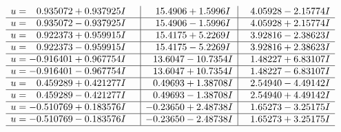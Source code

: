 \documentclass[1p]{elsarticle_modified}
\theoremstyle{definition}
\begin{document}
$$\begin{array}{c|c|c}
\begin{aligned}
u &= \phantom{-}0.935072 + 0.937925 I\end{aligned}
 & \phantom{-}15.4906 + 1.5996 I & \phantom{-}4.05928 - 2.15774 I \\ \hline\begin{aligned}
u &= \phantom{-}0.935072 - 0.937925 I\end{aligned}
 & \phantom{-}15.4906 - 1.5996 I & \phantom{-}4.05928 + 2.15774 I \\ \hline\begin{aligned}
u &= \phantom{-}0.922373 + 0.959915 I\end{aligned}
 & \phantom{-}15.4175 + 5.2269 I & \phantom{-}3.92816 - 2.38623 I \\ \hline\begin{aligned}
u &= \phantom{-}0.922373 - 0.959915 I\end{aligned}
 & \phantom{-}15.4175 - 5.2269 I & \phantom{-}3.92816 + 2.38623 I \\ \hline\begin{aligned}
u &= -0.916401 + 0.967754 I\end{aligned}
 & \phantom{-}13.6047 - 10.7354 I & \phantom{-}1.48227 + 6.83107 I \\ \hline\begin{aligned}
u &= -0.916401 - 0.967754 I\end{aligned}
 & \phantom{-}13.6047 + 10.7354 I & \phantom{-}1.48227 - 6.83107 I \\ \hline\begin{aligned}
u &= \phantom{-}0.459289 + 0.421277 I\end{aligned}
 & \phantom{-}0.49693 + 1.38708 I & \phantom{-}2.54940 - 4.49142 I \\ \hline\begin{aligned}
u &= \phantom{-}0.459289 - 0.421277 I\end{aligned}
 & \phantom{-}0.49693 - 1.38708 I & \phantom{-}2.54940 + 4.49142 I \\ \hline\begin{aligned}
u &= -0.510769 + 0.183576 I\end{aligned}
 & -0.23650 + 2.48738 I & \phantom{-}1.65273 - 3.25175 I \\ \hline\begin{aligned}
u &= -0.510769 - 0.183576 I\end{aligned}
 & -0.23650 - 2.48738 I & \phantom{-}1.65273 + 3.25175 I\\
 \hline 
 \end{array}$$\newpage
\newpage\renewcommand{\arraystretch}{1}
\end{document}
